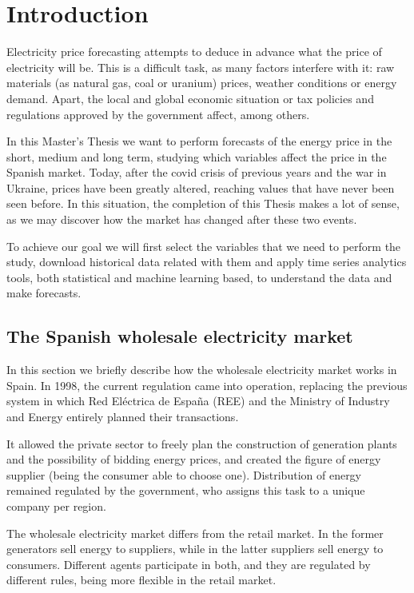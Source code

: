 \chapter{Introduction}
Electricity price forecasting attempts to deduce in advance what the price of electricity will be.
This is a difficult task, as many factors interfere with it: raw materials (as natural gas, coal or uranium) prices, weather conditions or energy demand.
Apart, the local and global economic situation or tax policies and regulations approved by the government affect, among others.

In this Master's Thesis we want to perform forecasts of the energy price in the short, medium and long term, studying which variables affect the price in the Spanish market.
Today, after the covid crisis of previous years and the war in Ukraine, prices have been greatly altered, reaching values that have never been seen before.
In this situation, the completion of this Thesis makes a lot of sense, as we may discover how the market has changed after these two events.

To achieve our goal we will first select the variables that we need to perform the study, download historical data related with them and apply time series analytics tools, both statistical and machine learning based, to understand the data and make forecasts.


\section{The Spanish wholesale electricity market}
In this section we briefly describe how the wholesale electricity market works in Spain.
In 1998, the current regulation came into operation, replacing the previous system in which Red Eléctrica de España (REE) and the Ministry of Industry and Energy entirely planned their transactions.

It allowed the private sector to freely plan the construction of generation plants and the possibility of bidding energy prices, and created the figure of energy supplier (being the consumer able to choose one).
Distribution of energy remained regulated by the government, who assigns this task to a unique company per region. \cite{mercado-electrico-mincotur}

The wholesale electricity market differs from the retail market. In the former generators sell energy to suppliers, while in the latter suppliers sell energy to consumers. Different agents participate in both, and they are regulated by different rules, being more flexible in the retail market.

